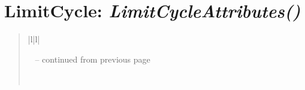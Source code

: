 \documentclass[letterpaper,10pt,english]{sphinxmanual}
\begin{document}
\section{\textbf{LimitCycle}: \emph{LimitCycleAttributes()}}
\label{attributes:limitcycle-limitcycleattributes}
\begin{DUlineblock}{0em}
\item[] 
\end{DUlineblock}
\begin{quote}

\begin{longtable}{|l|l|}
\hline
\endfirsthead

%
{{\textsf{\tablename\ \thetable{} -- continued from previous page}}} \\
\hline
\endhead

\hline {} \\ \hline
\endfoot

\endlastfoot



\end{longtable}
\end{quote}
\end{document}
